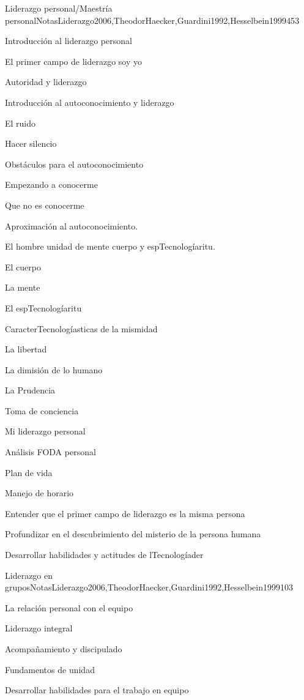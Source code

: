 \begin{syllabus}
\begin{unit}{Liderazgo personal/Maestría personal}{NotasLiderazgo2006,TheodorHaecker,Guardini1992,Hesselbein1999}{45}{3}
\begin{topics}
	\item Introducción al liderazgo personal
	\item El primer campo de liderazgo soy yo
	\item Autoridad y liderazgo
	\item Introducción al autoconocimiento y liderazgo
	\item El ruido
	\item Hacer silencio
	\item Obstáculos para el autoconocimiento
	\item Empezando a conocerme
	\item Que no es conocerme
	\item Aproximación al autoconocimiento.
	\item El hombre unidad de mente cuerpo y espTecnologíaritu.
	\item El cuerpo
	\item La mente
	\item El espTecnologíaritu
	\item CaracterTecnologíasticas de la mismidad
	\item La libertad
	\item La dimisión de lo humano
	\item La Prudencia
	\item Toma de conciencia
	\item Mi liderazgo personal
	\item Análisis FODA personal
	\item Plan de vida
	\item Manejo de horario
\end{topics}
\begin{learningoutcomes}
	\item Entender que el primer campo de liderazgo es la misma persona
	\item Profundizar en el descubrimiento del misterio de la persona humana
	\item Desarrollar habilidades y actitudes de lTecnologíader
\end{learningoutcomes}
\end{unit}

\begin{unit}{Liderazgo en grupos}{NotasLiderazgo2006,TheodorHaecker,Guardini1992,Hesselbein1999}{10}{3}
\begin{topics}
	\item La relación personal con el equipo
	\item Liderazgo integral
	\item Acompañamiento y discipulado
	\item Fundamentos de unidad
\end{topics}
\begin{learningoutcomes}
	\item Desarrollar habilidades para el trabajo en equipo
\end{learningoutcomes}
\end{unit}




\end{syllabus}
